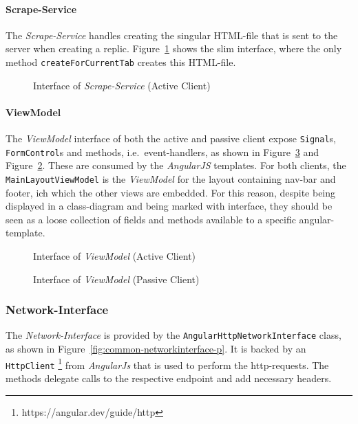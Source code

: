 \paragraph{Scrape-Service}\label{par:active-scrape-service}
The \textit{Scrape-Service} handles creating the singular HTML-file that is sent to the server when creating a replic.
Figure~\ref{fig:active-scrape-service} shows the slim interface, where the only method \texttt{createForCurrentTab} creates this HTML-file.

\begin{figure}
    \centering

    \caption{Interface of \textit{Scrape-Service} (Active Client)}
    \label{fig:active-scrape-service}
\end{figure}

\paragraph{ViewModel}\label{par:viewmodel}
The \textit{ViewModel} interface of both the active and passive client expose \texttt{Signal}s, \texttt{FormControl}s and methods, i.e.\ event-handlers, as shown in Figure~\ref{fig:passive-viewmodel} and Figure~\ref{fig:active-viewmodel}.
These are consumed by the \textit{AngularJS} templates.
For both clients, the \texttt{MainLayoutViewModel} is the \textit{ViewModel} for the layout containing nav-bar and footer, ich which the other views are embedded.
For this reason, despite being displayed in a class-diagram and being marked with \«interface\», they should be seen as a loose collection of fields and methods available to a specific angular-template.

\begin{figure}
    \centering

    \caption{Interface of \textit{ViewModel} (Active Client)}
    \label{fig:active-viewmodel}
\end{figure}

\begin{figure}
    \centering

    \caption{Interface of \textit{ViewModel} (Passive Client)}
    \label{fig:passive-viewmodel}
\end{figure}

\subsubsection{Network-Interface}
The \textit{Network-Interface} is provided by the \texttt{AngularHttpNetworkInterface} class, as shown in Figure~\ref{fig:common-networkinterface-p}.
It is backed by an \texttt{HttpClient} \footnote{https://angular.dev/guide/http} from \textit{AngularJs} that is used to perform the http-requests.
The methods delegate calls to the respective endpoint and add necessary headers.

